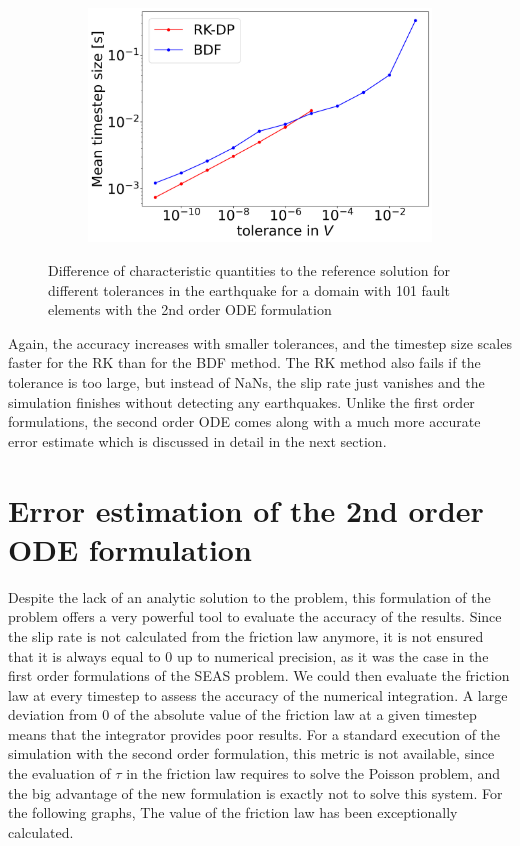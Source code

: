 \begin{figure}[H]
\begin{subfigure}[t]{0.32\textwidth}
		\includegraphics[width=1\textwidth]{images/TANDEMextendedODEDifferentTolerancesSize101_EQ_DT.png}
	\end{subfigure}
	\caption{Difference of characteristic quantities to the reference solution for different tolerances in the earthquake for a domain with 101 fault elements with the 2nd order ODE formulation}
	\label{fig:tolerancesEarthquake_extendedODE}
\end{figure}
Again, the accuracy increases with smaller tolerances, and the timestep size scales faster for the RK than for the BDF method. The RK method also fails if the tolerance is too large, but instead of NaNs, the slip rate just vanishes and the simulation finishes without detecting any earthquakes. Unlike the first order formulations, the second order ODE comes along with a much more accurate error estimate which is discussed in detail in the next section.




\section{Error estimation of the 2nd order ODE formulation}
\label{sec:Results_ErrorEstimate2ndOrderODE}
Despite the lack of an analytic solution to the problem, this formulation of the problem offers a very powerful tool to evaluate the accuracy of the results. Since the slip rate is not calculated from the friction law anymore, it is not ensured that it is always equal to 0 up to numerical precision, as it was the case in the first order formulations of the SEAS problem. We could then evaluate the friction law at every timestep to assess the accuracy of the numerical integration. A large deviation from 0 of the absolute value of the friction law at a given timestep means that the integrator provides poor results. For a standard execution of the simulation with the second order formulation, this metric is not available, since the evaluation of $\tau$ in the friction law requires to solve the Poisson problem, and the big advantage of the new formulation is exactly not to solve this system. For the following graphs, The value of the friction law has been exceptionally calculated. \\

